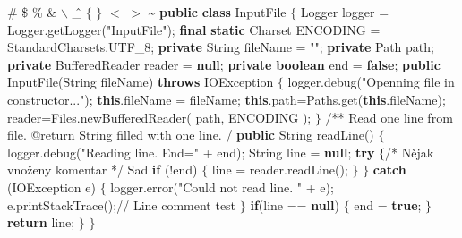  \# \$ \% \& $\backslash$ \^ \_ $\{$ $\}$  $<$ $>$ \~\codetexNewline
{} {\bf {\localcolor \Blue public}} {\bf {\localcolor \Blue class}} InputFile $\{$\codetexNewline
{} Logger logger = Logger.getLogger({\localcolor \Yellow "InputFile"});\codetexNewline
{} {\bf {\localcolor \Blue final}} {\bf {\localcolor \Blue static}} Charset ENCODING = StandardCharsets.UTF\_8;\codetexNewline
{} \codetexNewline
{} {\bf {\localcolor \Blue private}} String fileName = {\localcolor \Yellow ""};\codetexNewline
{} {\bf {\localcolor \Blue private}} Path path;\codetexNewline
{} {\bf {\localcolor \Blue private}} BufferedReader reader = {\bf {\localcolor \Blue null}};\codetexNewline
{} {\bf {\localcolor \Blue private}} {\bf {\localcolor \Blue boolean}} end = {\bf {\localcolor \Blue false}};\codetexNewline
{} \codetexNewline
{} {\bf {\localcolor \Blue public}} InputFile(String fileName) {\bf {\localcolor \Blue throws}} IOException $\{$\codetexNewline
{} logger.debug({\localcolor \Yellow "Openning file in constructor..."});\codetexNewline
{} {\bf {\localcolor \Blue this}}.fileName = fileName;\codetexNewline
{} {\bf {\localcolor \Blue this}}.path=Paths.get({\bf {\localcolor \Blue this}}.fileName);\codetexNewline
{} reader=Files.newBufferedReader( path, ENCODING );\codetexNewline
{} $\}$\codetexNewline
{} \codetexNewline
{} {\localcolor \Grey /**}\codetexNewline
{} {\localcolor \Grey * Read one line from file.}\codetexNewline
{} {\localcolor \Grey *}\codetexNewline
{} {\localcolor \Grey * @return String filled with one line.}\codetexNewline
{} {\localcolor \Grey */}\codetexNewline
{} {\bf {\localcolor \Blue public}} String readLine() $\{$\codetexNewline
{} logger.debug({\localcolor \Yellow "Reading line. End="} + end);\codetexNewline
{} String line = {\bf {\localcolor \Blue null}};\codetexNewline
{} \codetexNewline
{} {\bf {\localcolor \Blue try}} $\{${\localcolor \Grey /* Nějak vnoženy}\codetexNewline
{} {\localcolor \Grey komentar */} Sad\codetexNewline
{} {\bf {\localcolor \Blue if}} (!end) $\{$\codetexNewline
{} line = reader.readLine();\codetexNewline
{} $\}$\codetexNewline
{} $\}$ {\bf {\localcolor \Blue catch}} (IOException e) $\{$\codetexNewline
{} logger.error({\localcolor \Yellow "Could not read line. "} + e);\codetexNewline
{} e.printStackTrace();{\localcolor \Grey // Line comment test}\codetexNewline
{} $\}$\codetexNewline
{} \codetexNewline
{} {\bf {\localcolor \Blue if}}(line == {\bf {\localcolor \Blue null}}) $\{$\codetexNewline
{} end = {\bf {\localcolor \Blue true}};\codetexNewline
{} $\}$\codetexNewline
{} \codetexNewline
{} {\bf {\localcolor \Blue return}} line;\codetexNewline
{} $\}$\codetexNewline
{} $\}$\codetexNewline

